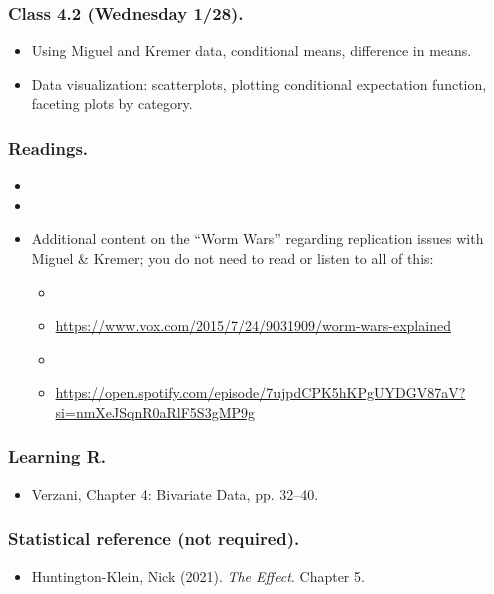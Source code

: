 \documentclass[letterpaper, 12pt, parskip=full,DIV=10]{scrartcl}
\begin{document}
\subsubsection*{Class 4.2 (Wednesday 1/28).}
\begin{itemize}
\item Using Miguel and Kremer data, conditional means, difference in means.
\item Data visualization: scatterplots, plotting conditional expectation function, faceting plots by category.
\end{itemize}

\subsubsection*{Readings.}
\begin{itemize}
\item {}
\item {}
\item Additional content on the ``Worm Wars'' regarding replication issues with Miguel \& Kremer; you do not need to read or listen to all of this:
\begin{itemize}
\item {}
\item \url{https://www.vox.com/2015/7/24/9031909/worm-wars-explained}
\item {}
\item \url{https://open.spotify.com/episode/7ujpdCPK5hKPgUYDGV87aV?si=nmXeJSqnR0aRlF5S3gMP9g}
\end{itemize}
\end{itemize}

\subsubsection*{Learning R.}
\begin{itemize}
\item Verzani, Chapter 4: Bivariate Data, pp. 32--40.
\end{itemize}

\subsubsection*{Statistical reference (not required).}
\begin{itemize}
\item Huntington-Klein, Nick (2021). \textit{The Effect}. Chapter 5.
\end{itemize}
\end{document}
